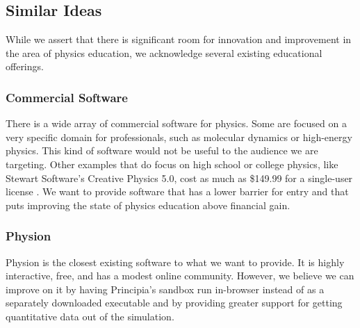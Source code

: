 
\subsection{Similar Ideas}

\noindent
While we assert that there is significant room for innovation and improvement in the area of physics education, we acknowledge several existing educational offerings.


\subsubsection{Commercial Software}
There is a wide array of commercial software for physics. Some are focused on a very specific domain for professionals, such as molecular dynamics or high-energy physics. This kind of software would not be useful to the audience we are targeting. Other examples that do focus on high school or college physics, like Stewart Software's Creative Physics\textup{\textregistered} 5.0, cost as much as \$149.99 for a single-user license \cite{CreativePhysics}. We want to provide software that has a lower barrier for entry and that puts improving the state of physics education above financial gain.

\subsubsection{Physion}
Physion is the closest existing software to what we want to provide. It is highly interactive, free, and has a modest online community. However, we believe we can improve on it by having Principia's sandbox run in-browser instead of as a separately downloaded executable and by providing greater support for getting quantitative data out of the simulation.

\clearpage
\BgThispage
